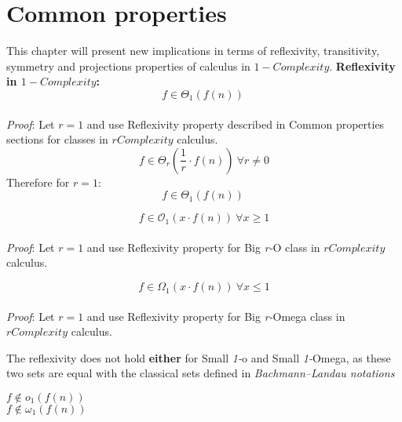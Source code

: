\section{Common properties}
This chapter will present new implications in terms of reflexivity, transitivity, symmetry and projections properties of calculus in $1-Complexity$.
 \hfill\break
 \textbf{Reflexivity in $1-Complexity$:}  \[ f \in \Theta_{1} \left( f(n) \right)\ \]
   \\\textit{Proof}:
   Let $r = 1$ and use Reflexivity property described in Common properties sections for classes in $rComplexity$ calculus.
   \[ f \in \Theta_{r} \left( \frac{1}{r} \cdot f(n) \right)\ \forall r \neq 0 \]
   Therefore for $r = 1$:
 \[ f \in \Theta_{1} \left( f(n) \right)\ \]
 \qedsymbol
 
 
 \[ f \in \mathcal{O}_{1} \left( x \cdot f(n) \right)\ \forall x \geq 1 \]
   \\\textit{Proof}:
   Let $r = 1$ and use Reflexivity property for Big \textit{r-}O class in $rComplexity$ calculus.
 \qedsymbol

 \[ f \in \Omega_{1} \left( x \cdot f(n) \right)\ \forall x \leq 1 \]
   \\\textit{Proof}:
   Let $r = 1$ and use Reflexivity property for Big \textit{r-}Omega class in $rComplexity$ calculus.
 \qedsymbol


The reflexivity does not hold \textbf{either} for Small \textit{1-}o and Small \textit{1-}Omega, as these two sets are equal with the classical sets defined in \textit{Bachmann–Landau notations}
 
$ f \notin o_{1}(f(n)) $ \\$ f \notin \omega_{1}(f(n)) $ 
 \hfill\break

